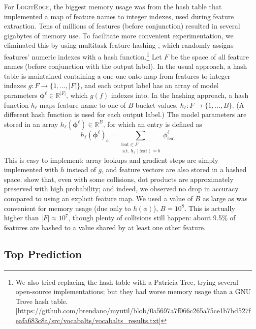 \documentclass[11pt]{article}
\newcommand{\codenote}[1]{\textcolor{PineGreen}{[#1]}}
\newcommand{\logitedge}{\textsc{LogitEdge}}
\begin{document}
\noindent
For \logitedge, the biggest memory usage was from
the hash table that implemented
a map of feature names to integer indexes, used during feature extraction.
Tens of millions of features (before conjunction) resulted in several gigabytes of memory use.  To facilitate more convenient experimentation,
we eliminated this by using
multitask feature hashing
\cite{weinberger_feature_2009},
which randomly assigns features' numeric indexes with a hash function.\footnote{We also tried replacing the hash table with a Patricia Tree, trying several open-source implementations; but they had worse memory usage than a GNU Trove hash table. 
  \codenote{\url{https://github.com/brendano/myutil/blob/0a5697a7f066c265a75ce1b7bd527feafa683c8a/src/vocabalts/vocabalts_results.txt}}}
Let $F$ be the space of all feature names (before conjunction with the output label).
In the usual approach, a hash table is maintained containing a
one-one onto map from features to integer indexes $g: F \rightarrow \{1,\ldots,|F|\}$,
and each output label has an array of model parameters $\bm\phi^\ell \in \mathbb{R}^{|F|}$,
which $g(f)$ indexes into.
In the hashing approach, a hash function $h_{\ell}$
maps feature name to one of $B$ bucket values,
$h_{\ell} : F \rightarrow \{1, \ldots, B\}$.
(A different hash function is used for each output label.)
The model parameters are stored in an array $h_\ell(\bm\phi^\ell) \in \mathbb{R}^{B}$,
for which an entry is defined as
\[
  h_\ell(\bm\phi^\ell)_{b} = 
  \sum_{\substack{\text{feat} \in F 
    \\\text{ s.t. } h_\ell(\text{feat})=b}}
  {\phi^\ell_{\text{feat}}}
\]
This is easy to implement:
array lookups and gradient steps are simply implemented with $h$ instead of $g$, and feature vectors are also stored in a hashed space.
\cite{weinberger_feature_2009} show that, even with some collisions,
dot products are approximately preserved with high probability;
and indeed, we observed no drop in accuracy compared to using an explicit feature map.
We used a value of $B$ as large as was convenient for memory usage (due only to $h(\phi)$), $B=10^{8}$.
This is actually higher than $|F|\approx 10^7$, though plenty of collisions still happen: about 9.5\% of features are hashed to a value shared by at least one other feature.



\subsection{Top Prediction} \label{s:top_model}
\end{document}
